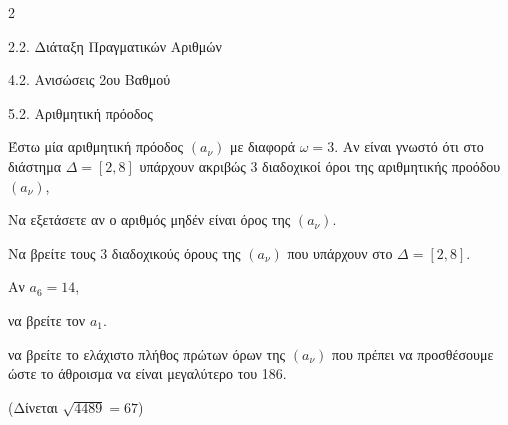 \begin{ylh}{2}
    \item 2.2. Διάταξη Πραγματικών Αριθμών
    \item 4.2. Ανισώσεις 2ου Βαθμού
    \item 5.2. Αριθμητική πρόοδος
\end{ylh}
Έστω μία αριθμητική πρόοδος $(a_\nu)$ με διαφορά $\omega = 3$. Αν είναι γνωστό ότι στο διάστημα $\Delta = [2, 8]$ υπάρχουν ακριβώς 3 διαδοχικοί όροι της αριθμητικής προόδου $(a_\nu)$,

\begin{alist}
\item Να εξετάσετε αν ο αριθμός μηδέν είναι όρος της $(a_\nu)$.
\item Να βρείτε τους 3 διαδοχικούς όρους της $(a_\nu)$ που υπάρχουν στο $\Delta = [2, 8]$.
\item Αν $a_6 = 14$,

\begin{rlist}
\item να βρείτε τον $a_1$.
\item να βρείτε το ελάχιστο πλήθος πρώτων όρων της $(a_\nu)$ που πρέπει να προσθέσουμε ώστε το άθροισμα να είναι μεγαλύτερο του 186.

(Δίνεται $\sqrt{4489} = 67$)
\end{rlist}
\end{alist}

